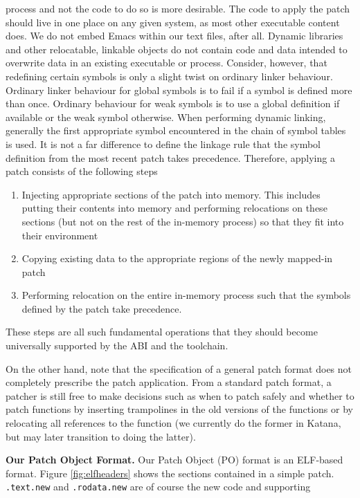 process and not the code to do so is more desirable. The code to apply
the patch should live in one place on any given system, as most other
executable content does. We do not embed Emacs within our text files,
after all. Dynamic libraries and other relocatable, linkable objects
do not contain code and data intended to overwrite data in an existing
executable or process. Consider, however, that redefining certain
symbols is only a slight twist on ordinary linker behaviour. Ordinary
linker behaviour for global symbols is to fail if a symbol is defined
more than once. Ordinary behaviour for weak symbols is to use a global
definition if available or the weak symbol otherwise. When performing
dynamic linking, generally the first appropriate symbol encountered in
the chain of symbol tables is used. It is not a far difference to
define the linkage rule that the symbol definition from the most
recent patch takes precedence. Therefore, applying a patch consists of
the following steps
\begin{enumerate}
\item Injecting appropriate sections of the patch into memory. This
includes putting their contents into memory and performing relocations
on these sections (but not on the rest of the in-memory process) so
that they fit into their environment
\item Copying existing data to the appropriate regions of the newly
mapped-in patch
\item Performing relocation on the entire in-memory process such that the
symbols defined by the patch take precedence.
\end{enumerate}
These steps are all such fundamental operations that they should
become universally supported by the ABI and the toolchain. 

On the other hand, note that the specification of a general patch
format does not completely prescribe the patch application. From a
standard patch format, a patcher is still free to make decisions such
as when to patch safely and whether to patch functions by inserting
trampolines in the old versions of the functions or by relocating all
references to the function (we currently do the former in Katana, but
may later transition to doing the latter).

{\bf Our Patch Object Format.}
Our Patch Object (PO) format is an ELF-based format. Figure
\ref{fig:elfheaders} shows the sections contained in a simple
patch. \texttt{.text.new} and \texttt{.rodata.new} are of course the
new code and supporting

